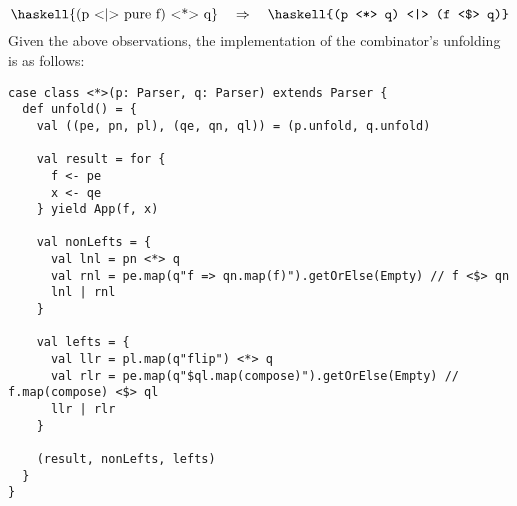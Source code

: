 \documentclass[../../main.tex]{subfiles}
\begin{document}
\begin{equation} \label{eq:ap-leftrec}
\text{\haskell{(p <|> pure f) <*> q}} \quad \Rightarrow \quad \text{\haskell{(p <*> q) <|> (f <$> q)}}
\vspace{3ex} %
\end{equation}
%
Given the above observations, the implementation of the \scala{<*>} combinator's unfolding is as follows:
\begin{verbatim}
case class <*>(p: Parser, q: Parser) extends Parser {
  def unfold() = {
    val ((pe, pn, pl), (qe, qn, ql)) = (p.unfold, q.unfold)

    val result = for {
      f <- pe
      x <- qe
    } yield App(f, x)

    val nonLefts = {
      val lnl = pn <*> q
      val rnl = pe.map(q"f => qn.map(f)").getOrElse(Empty) // f <$> qn
      lnl | rnl
    }

    val lefts = {
      val llr = pl.map(q"flip") <*> q
      val rlr = pe.map(q"$ql.map(compose)").getOrElse(Empty) // f.map(compose) <$> ql
      llr | rlr
    }

    (result, nonLefts, lefts)
  }
}
\end{verbatim}
\end{document}
